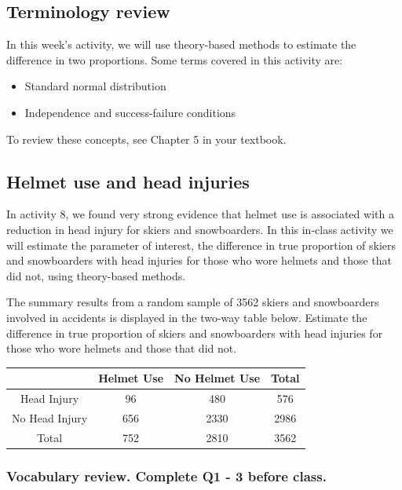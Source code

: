 \documentclass[
]{report}
\begin{document}
\hypertarget{terminology-review-8}{%
\subsection{Terminology review}\label{terminology-review-8}}

In this week's activity, we will use theory-based methods to estimate the difference in two proportions. Some terms covered in this activity are:

\begin{itemize}
\item
  Standard normal distribution
\item
  Independence and success-failure conditions
\end{itemize}

To review these concepts, see Chapter 5 in your textbook.

\hypertarget{helmet-use-and-head-injuries-1}{%
\subsection{Helmet use and head injuries}\label{helmet-use-and-head-injuries-1}}

In activity 8, we found very strong evidence that helmet use is associated with a reduction in head injury for skiers and snowboarders. In this in-class activity we will estimate the parameter of interest, the difference in true proportion of skiers and snowboarders with head injuries for those who wore helmets and those that did not, using theory-based methods.

The summary results from a random sample of 3562 skiers and snowboarders involved in accidents is displayed in the two-way table below. Estimate the difference in true proportion of skiers and snowboarders with head injuries for those who wore helmets and those that did not.

\begin{longtable}[]{@{}cccc@{}}
\toprule
& Helmet Use & No Helmet Use & Total\tabularnewline
\midrule
\endhead
Head Injury & 96 & 480 & 576\tabularnewline
No Head Injury & 656 & 2330 & 2986\tabularnewline
Total & 752 & 2810 & 3562\tabularnewline
\bottomrule
\end{longtable}

\hypertarget{vocabulary-review.-complete-q1---3-before-class.-1}{%
\subsubsection*{Vocabulary review. Complete Q1 - 3 before class.}\label{vocabulary-review.-complete-q1---3-before-class.-1}}
\end{document}
